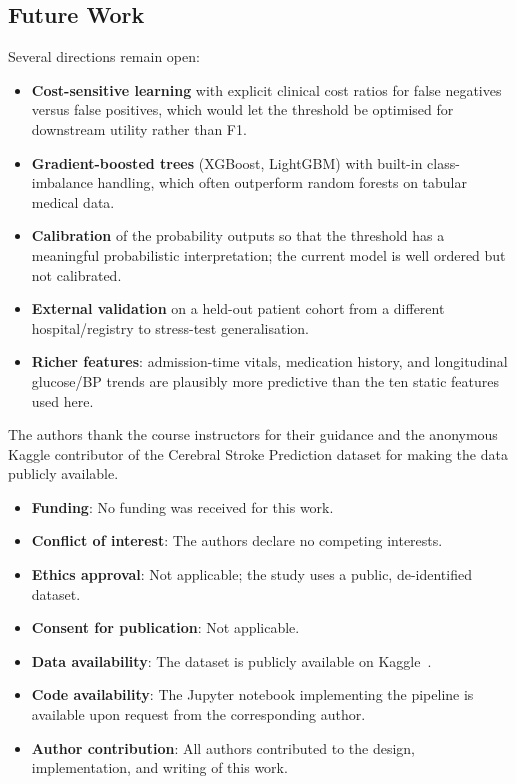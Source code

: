\documentclass[pdflatex,sn-basic,Numbered]{sn-jnl}
\theoremstyle{thmstyleone}
\theoremstyle{thmstyletwo}
\theoremstyle{thmstylethree}
\begin{document}
\subsection{Future Work}
Several directions remain open:
\begin{itemize}
\item \textbf{Cost-sensitive learning} with explicit clinical cost ratios
for false negatives versus false positives, which would let the threshold
be optimised for downstream utility rather than F1.
\item \textbf{Gradient-boosted trees} (XGBoost, LightGBM) with built-in
class-imbalance handling, which often outperform random forests on tabular
medical data.
\item \textbf{Calibration} of the probability outputs so that the threshold
has a meaningful probabilistic interpretation; the current model is well
ordered but not calibrated.
\item \textbf{External validation} on a held-out patient cohort from a
different hospital/registry to stress-test generalisation.
\item \textbf{Richer features}: admission-time vitals, medication history,
and longitudinal glucose/BP trends are plausibly more predictive than the
ten static features used here.
\end{itemize}

\backmatter

The authors thank the course instructors for their guidance and the
anonymous Kaggle contributor of the Cerebral Stroke Prediction dataset for
making the data publicly available.

\begin{itemize}
\item \textbf{Funding}: No funding was received for this work.
\item \textbf{Conflict of interest}: The authors declare no competing
interests.
\item \textbf{Ethics approval}: Not applicable; the study uses a public,
de-identified dataset.
\item \textbf{Consent for publication}: Not applicable.
\item \textbf{Data availability}: The dataset is publicly available on
Kaggle~\cite{kaggle-stroke}.
\item \textbf{Code availability}: The Jupyter notebook implementing the
pipeline is available upon request from the corresponding author.
\item \textbf{Author contribution}: All authors contributed to the design,
implementation, and writing of this work.
\end{itemize}
\end{document}
